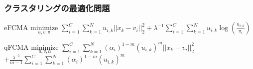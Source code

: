 \documentclass[13pt,dvipdfmx]{beamer}
\begin{document}
\begin{frame}\frametitle{クラスタリングの最適化問題}
  \begin{block}{eFCMA}
  \quad$\underset{u,v,\pi}{\text{minimize}}$
    $\sum_{i=1}^C\sum_{k=1}^Nu_{i,k}||x_k-v_i||_2^2+\lambda^{-1}\sum_{i=1}^C\sum_{k=1}^Nu_{i,k}\log(\frac{u_{i,k}}{\pi_{i}})$
  \end{block}
  
  \begin{block}{qFCMA}
    \quad$\underset{u,v,\alpha}{\text{minimize}}$
    $\sum_{i=1}^C\sum_{k=1}^N(\alpha_{i})^{1-m}(u_{i,k})^m||x_k-v_i||_2^2$\\
    \qquad\qquad\qquad\qquad$+\frac{\lambda^{-1}}{m-1}\sum_{i=1}^C\sum_{k=1}^N(\alpha_{i})^{1-m}(u_{i,k})^m$
  \end{block}


\end{frame}
\end{document}
